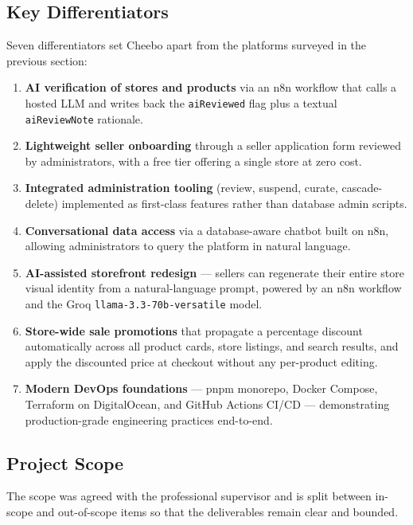 \documentclass[12pt, a4paper, oneside]{report}
\begin{document}
\subsection{Key Differentiators}

Seven differentiators set Cheebo apart from the platforms surveyed in
the previous section:

\begin{enumerate}[label=\textbf{D\arabic*.},leftmargin=*,itemsep=2pt]
  \item \textbf{AI verification of stores and products} via an n8n
        workflow that calls a hosted LLM and writes back the
        \texttt{aiReviewed} flag plus a textual \texttt{aiReviewNote}
        rationale.
  \item \textbf{Lightweight seller onboarding} through a seller
        application form reviewed by administrators, with a free tier
        offering a single store at zero cost.
  \item \textbf{Integrated administration tooling} (review, suspend,
        curate, cascade-delete) implemented as first-class features
        rather than database admin scripts.
  \item \textbf{Conversational data access} via a database-aware
        chatbot built on n8n, allowing administrators to query the
        platform in natural language.
  \item \textbf{AI-assisted storefront redesign} --- sellers can
        regenerate their entire store visual identity from a
        natural-language prompt, powered by an n8n workflow and the
        Groq \texttt{llama-3.3-70b-versatile} model.
  \item \textbf{Store-wide sale promotions} that propagate a
        percentage discount automatically across all product cards,
        store listings, and search results, and apply the discounted
        price at checkout without any per-product editing.
  \item \textbf{Modern DevOps foundations} --- pnpm monorepo, Docker
        Compose, Terraform on DigitalOcean, and GitHub Actions
        CI/CD --- demonstrating production-grade engineering
        practices end-to-end.
\end{enumerate}

\subsection{Project Scope}

The scope was agreed with the professional supervisor and is split
between in-scope and out-of-scope items so that the deliverables
remain clear and bounded.
\end{document}
